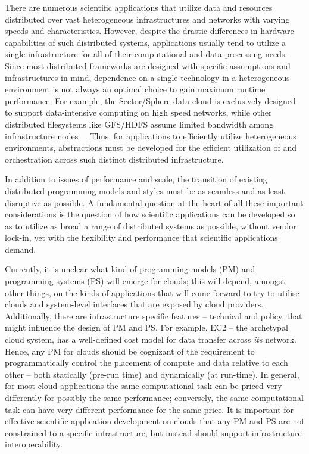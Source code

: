 \documentclass[3p,twocolumn]{elsarticle}
\begin{document}
There are numerous scientific applications that utilize data and
resources distributed over vast heterogeneous infrastructures and
networks with varying speeds and characteristics. However, despite the
drastic differences in hardware capabilities of such distributed
systems, applications usually tend to utilize a single infrastructure
for all of their computational and data processing needs. Since most
distributed frameworks are designed with specific assumptions and
infrastructures in mind, dependence on a single technology in a
heterogeneous environment is not always an optimal choice to gain
maximum runtime performance. For example, the Sector/Sphere data cloud
is exclusively designed to support data-intensive computing on high
speed networks, while other distributed filesystems like GFS/HDFS
assume limited bandwidth among infrastructure nodes ~\cite{GFS, HDFS}. Thus,
for applications to efficiently utilize heterogeneous environments,
abstractions must be developed for the efficient utilization of and
orchestration across such distinct distributed infrastructure. 

In addition to issues of performance and scale, the transition of
existing distributed programming models and styles must be as
seamless and as least disruptive as possible.  A fundamental question
at the heart of all these important considerations is the question of
how scientific applications can be developed so as to utilize as broad
a range of distributed systems as possible, without vendor lock-in,
yet with the flexibility and performance that scientific applications
demand.

Currently, it is unclear what kind of programming models (PM) and
programming systems (PS) will emerge for clouds; this will depend,
amongst other things, on the kinds of applications that will come
forward to try to utilise clouds and system-level interfaces that are
exposed by cloud providers.  Additionally, there are infrastructure
specific features -- technical and policy, that might influence the
design of PM and PS. For example, EC2 -- the archetypal cloud system,
has a well-defined cost model for data transfer across {\it its}
network. Hence, any PM for clouds should be cognizant of the
requirement to programmatically control the placement of compute and
data relative to each other -- both statically (pre-run time) and
dynamically (at run-time).  In general, for most cloud applications
the same computational task can be priced very differently for
possibly the same performance; conversely, the same computational task
can have very different performance for the same price. It is
important for effective scientific application development on clouds
that any PM and PS are not constrained to a specific infrastructure,
but instead should support infrastructure interoperability.  
\end{document}
